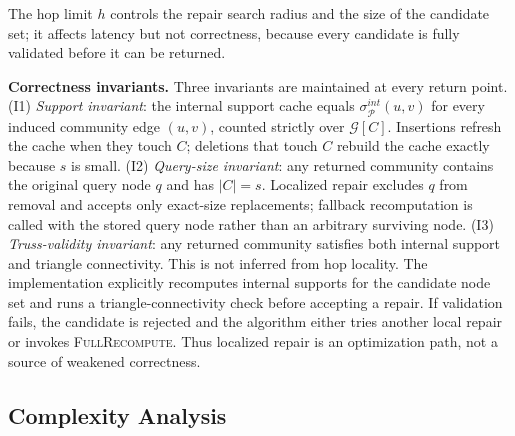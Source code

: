The hop limit $h$ controls the repair search radius and the size of the candidate set; it affects latency but not correctness, because every candidate is fully validated before it can be returned.

\textbf{Correctness invariants.} Three invariants are maintained at every return point. (I1) \emph{Support invariant}: the internal support cache equals $\sigma_{\mathcal{P}}^{int}(u,v)$ for every induced community edge $(u,v)$, counted strictly over $\mathcal{G}[C]$. Insertions refresh the cache when they touch $C$; deletions that touch $C$ rebuild the cache exactly because $s$ is small. (I2) \emph{Query-size invariant}: any returned community contains the original query node $q$ and has $|C|=s$. Localized repair excludes $q$ from removal and accepts only exact-size replacements; fallback recomputation is called with the stored query node rather than an arbitrary surviving node. (I3) \emph{Truss-validity invariant}: any returned community satisfies both internal support and triangle connectivity. This is not inferred from hop locality. The implementation explicitly recomputes internal supports for the candidate node set and runs a triangle-connectivity check before accepting a repair. If validation fails, the candidate is rejected and the algorithm either tries another local repair or invokes \textsc{FullRecompute}. Thus localized repair is an optimization path, not a source of weakened correctness.

\subsection{Complexity Analysis}

\begin{table}[htbp]
\centering
\caption{Per-update time complexity under projected source-edge updates. $d_{\mathcal{P}}$ denotes meta-path degree. The recompute row reflects the polynomial-time greedy heuristic; the NP-hard exact B\&B worst-case is exponential.}
\label{tab:complexity}
\end{table}

